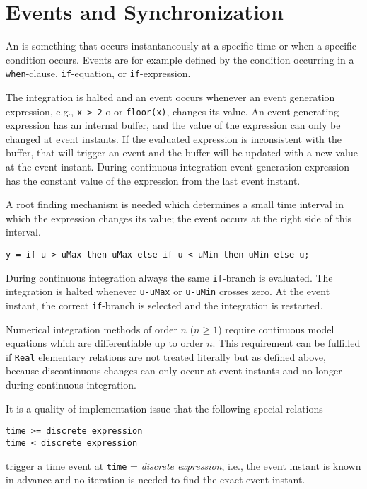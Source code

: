 \section{Events and Synchronization}\label{events-and-synchronization}

An  is something that occurs instantaneously at a specific time or when a specific condition occurs.
Events are for example defined by the condition occurring in a \lstinline!when!-clause, \lstinline!if!-equation, or \lstinline!if!-expression.

The integration is halted and an event occurs whenever an event generation expression, e.g., \lstinline!x > 2! o or \lstinline!floor(x)!, changes its value.
An event generating expression has an internal buffer, and the value of the expression can only be changed at event instants.
If the evaluated expression is inconsistent with the buffer, that will trigger an event and the buffer will be updated with a new value at the event instant.
During continuous integration event generation expression has the constant value of the expression from the last event instant.

\begin{nonnormative}
A root finding mechanism is needed which determines a small time interval in which the expression changes its value; the event occurs at the right side of this interval.
\end{nonnormative}

\begin{example}
\begin{lstlisting}[language=modelica]
y = if u > uMax then uMax else if u < uMin then uMin else u;
\end{lstlisting}

During continuous integration always the same \lstinline!if!-branch is evaluated.
The integration is halted whenever \lstinline!u-uMax! or \lstinline!u-uMin! crosses zero.
At the event instant, the correct \lstinline!if!-branch is selected and the integration is restarted.

Numerical integration methods of order $n$ ($n \geq 1$) require continuous model equations which are differentiable up to order $n$.
This requirement can be fulfilled if \lstinline!Real! elementary relations are not treated literally but as defined above, because discontinuous changes can only occur at event instants and no longer during continuous integration.
\end{example}

\begin{nonnormative}
It is a quality of implementation issue that the following special relations
\begin{lstlisting}[language=modelica]
time >= discrete expression
time < discrete expression
\end{lstlisting}
trigger a time event at \lstinline!time! = \emph{discrete expression}, i.e., the event instant is known in advance and no iteration is needed to find the exact event instant.
\end{nonnormative}

